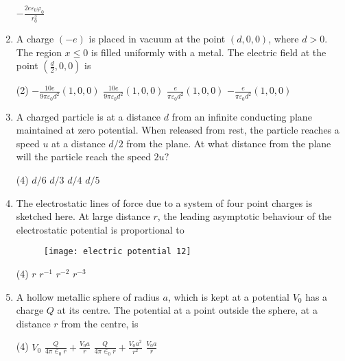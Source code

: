 \begin{enumerate}[label=\color{ocre}\textbf{\arabic*.}]
\begin{tasks}
		\task[\textbf{D.}] $-\frac{2 e \varepsilon_{0} \varphi_{0}}{r_{0}^{2}}$
	\end{tasks}
	\item A charge $(-e)$ is placed in vacuum at the point $(d, 0,0)$, where $d>0 .$ The region $x \leq 0$ is filled uniformly with a metal. The electric field at the point $\left(\frac{d}{2}, 0,0\right)$ is
	{}
	\begin{tasks}(2)
		\task[\textbf{A.}]  $-\frac{10 e}{9 \pi \varepsilon_{0} d^{2}}(1,0,0)$
		\task[\textbf{B.}]  $\frac{10 e}{9 \pi \varepsilon_{0} d^{2}}(1,0,0)$
		\task[\textbf{C.}] $\frac{e}{\pi \varepsilon_{0} d^{2}}(1,0,0)$
		\task[\textbf{D.}] $-\frac{e}{\pi \varepsilon_{0} d^{2}}(1,0,0)$
	\end{tasks}
\item A charged particle is at a distance $d$ from an infinite conducting plane maintained at zero potential. When released from rest, the particle reaches a speed $u$ at a distance $d / 2$ from the plane. At what distance from the plane will the particle reach the speed $2 u ?$
{}
\begin{tasks}(4)
	\task[\textbf{A.}] $d / 6$
	\task[\textbf{B.}] $d / 3$
	\task[\textbf{C.}] $d / 4$
	\task[\textbf{D.}] $d / 5$
\end{tasks}
\item  The electrostatic lines of force due to a system of four point charges is sketched here. At large distance $r$, the leading asymptotic behaviour of the electrostatic potential is proportional to
{}
\begin{figure}[H]
	\centering
	\texttt{[image: electric potential 12]}
\end{figure}
\begin{tasks}(4)
	\task[\textbf{A.}] $r$
	\task[\textbf{B.}] $r^{-1}$
	\task[\textbf{C.}] $r^{-2}$
	\task[\textbf{D.}] $r^{-3}$
\end{tasks}
\item A hollow metallic sphere of radius $a$, which is kept at a potential $V_{0}$ has a charge $Q$ at its centre. The potential at a point outside the sphere, at a distance $r$ from the centre, is
{}
\begin{tasks}(4)
	\task[\textbf{A.}] $V_{0}$
	\task[\textbf{B.}] $\frac{Q}{4 \pi \in_{0} r}+\frac{V_{0} a}{r}$
	\task[\textbf{C.}] $\frac{Q}{4 \pi \in_{0} r}+\frac{V_{0} a^{2}}{r^{2}}$
	\task[\textbf{D.}] $\frac{V_{0} a}{r}$
\end{tasks}

\end{enumerate}
